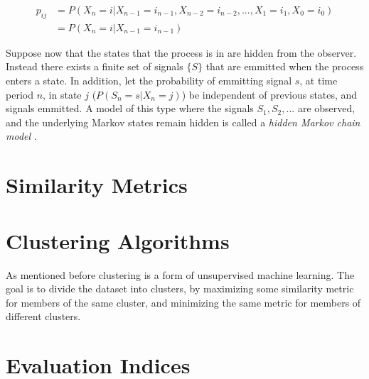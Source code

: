 \begin{equation}
    \begin{split}
        p_{ij} &= P(X_n = i | X_{n-1} = i_{n-1}, X_{n-2} = i_{n-2},..., X_{1} = i_{1}, X_{0} = i_{0}) \\
        &= P(X_n = i| X_{n-1} = i_{n-1})      
    \end{split}
    \label{eq:markov_property}
\end{equation}


Suppose now that the states that the process is in are hidden from the observer. Instead there exists a finite set of signals $\{S\}$ that are emmitted when the process enters a state. In addition, let the probability of emmitting signal $s$, at time period $n$, in state $j$ ($P(S_n = s | X_n = j)$) be independent of previous states, and signals emmitted. A model of this type where the signals $S_1, S_2, ...$ are observed, and the underlying Markov states remain hidden is called a \textit{hidden Markov chain model} \cite{stoch_pros}. 

\section{Similarity Metrics}

\section{Clustering Algorithms}
As mentioned before clustering is a form of unsupervised machine learning. The goal is to divide the dataset into clusters, by maximizing some similarity metric for members of the same cluster, and minimizing the same metric for members of different clusters.

\section{Evaluation Indices} 